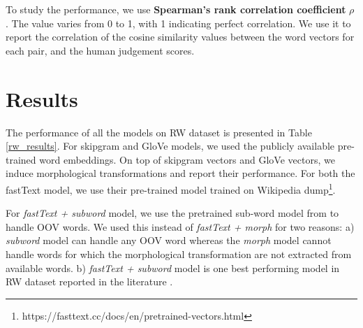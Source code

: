 To study the performance, we use \textbf{Spearman's rank correlation coefficient} $\rho$ \citep{spearman1904proof}. The value varies from 0 to 1, with 1 indicating perfect correlation. We use it to report the correlation of the cosine similarity values between the word vectors for each pair, and the human judgement scores.

\section{Results}

The performance of all the models on RW dataset is presented in Table \ref{rw_results}. For skipgram \citep{mikolov2013distributed} and GloVe \citep{pennington2014glove} models, we used the publicly available pre-trained word embeddings. On top of skipgram vectors and GloVe vectors, we induce morphological transformations and report their performance. For both the fastText model, we use their pre-trained model trained on Wikipedia dump\footnote{https://fasttext.cc/docs/en/pretrained-vectors.html}. 

For \textit{fastText + subword} model, we use the pretrained sub-word model from \citep{bojanowski2016enriching} to handle OOV words. We used this instead of \textit{fastText + morph} for two reasons: a) \textit{subword} model can handle any OOV word whereas the \textit{morph} model cannot handle words for which the morphological transformation are not extracted from available words. b) \textit{fastText + subword} model is one best performing model in RW dataset reported in the literature \citep{bojanowski2016enriching}.

